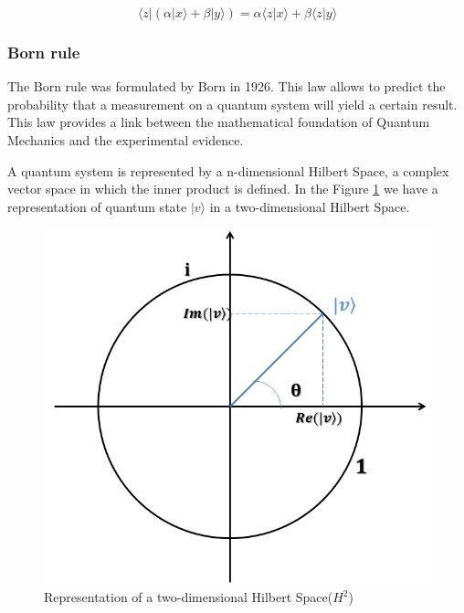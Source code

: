  

\begin{equation}
\label{eq_linearity}
\langle z\vert(\alpha\vert x\rangle+\beta\vert y\rangle)=\alpha\langle z\vert x\rangle+\beta\langle z\vert y\rangle
\end{equation}


\subsubsection{Born rule}

The Born rule was formulated by Born in 1926. This law allows to predict the probability that a measurement on a quantum system will yield a certain result. This law provides a link between the mathematical foundation of Quantum Mechanics and the experimental evidence\cite{VanRijsbergen2004}\cite{Landsman2009}. 

A quantum system is represented by a n-dimensional Hilbert Space, a complex vector space in which the inner product is defined. In the Figure \ref{fig:circle} we have a representation of quantum state $\vert v \rangle$ in a two-dimensional Hilbert Space. 

\begin{figure}[h]
\centering 

\includegraphics[scale=0.35]{Overview/Figures/complex_circle.png}
\caption{Representation of a two-dimensional Hilbert Space($H^{2}$)}
\label{fig:circle}
\end{figure}

